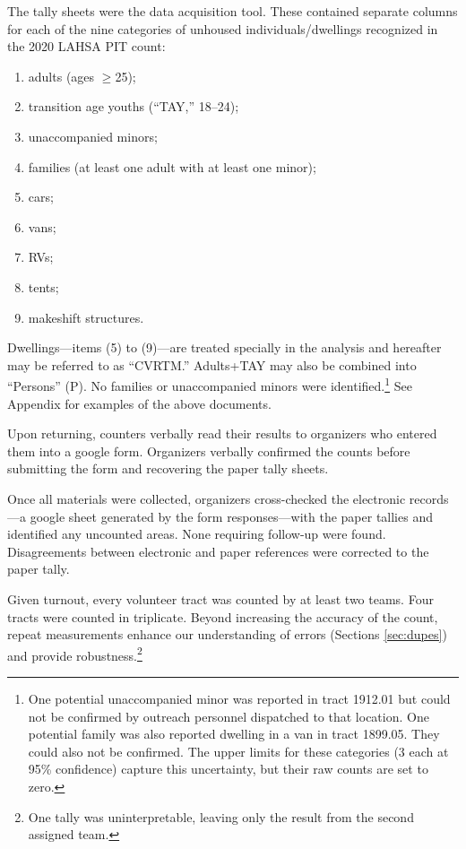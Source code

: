 \documentclass[11pt,twocolumn]{article}
\def\bfr{\bf\color{red}}
\begin{document}
The tally sheets were the data acquisition tool. These contained separate columns for each of the 
nine categories of unhoused individuals/dwellings recognized in the 2020 LAHSA PIT count: 
\begin{enumerate}
	\item adults (ages $\geq$25);
	\item transition age youths (``TAY,'' 18--24);
	\item unaccompanied minors;
	\item families (at least one adult with at least one minor); 
	\item cars;
	\item vans;
	\item RVs;
	\item tents;
	\item makeshift structures.
\end{enumerate}
Dwellings---items (5) to (9)---are treated specially in the analysis and hereafter 
may be referred to as ``CVRTM.'' Adults+TAY may also be combined into 
``Persons'' (P). No families or unaccompanied minors were identified.\footnote{
One potential unaccompanied minor was reported in tract 1912.01 but could not be confirmed by outreach
personnel dispatched to that location. One potential family was also reported dwelling in a van in
tract 1899.05. They could also not be confirmed. The upper limits for these categories (3 each at 95\%
confidence) capture this uncertainty, but their raw counts are set to zero.} See Appendix for examples
of the above documents.

Upon returning, counters verbally read their results to organizers who entered them into a google 
form. Organizers verbally confirmed the counts before submitting the form and recovering the
paper tally sheets.

Once all materials were collected, organizers cross-checked the electronic records---a
google sheet generated by the form responses---with the paper tallies and identified any 
uncounted areas. None requiring follow-up were found. Disagreements between electronic 
and paper references were corrected to the paper tally. 

Given turnout, every volunteer tract was counted by at least two teams. Four tracts were counted
in triplicate. Beyond increasing the accuracy of the count, repeat measurements enhance our 
understanding of errors (Sections \ref{sec:dupes}) and provide robustness.\footnote{One tally was 
uninterpretable, leaving only the result from the second assigned team.}
\end{document}
